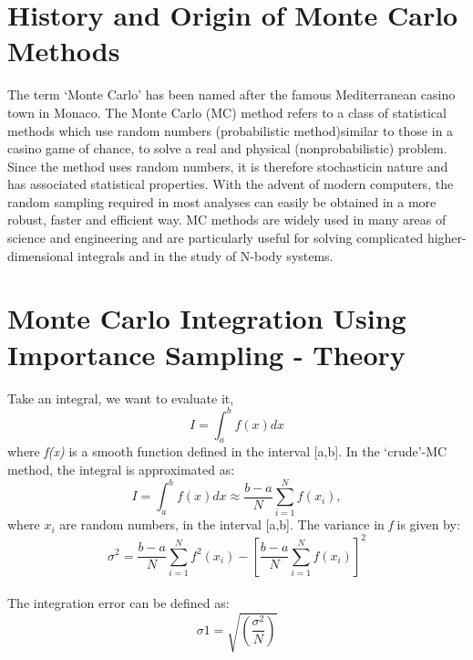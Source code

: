 \documentclass{article}
\begin{document}
\section{History and Origin of Monte Carlo \\ Methods}
The term ‘Monte Carlo’ has been named after the famous Mediterranean casino town in Monaco. The Monte Carlo (MC) method refers to a class of statistical methods which use random numbers (probabilistic method)similar to those in a casino game of chance, to solve a real and physical (nonprobabilistic) problem.  Since the method uses random numbers, it is therefore stochasticin nature and has associated statistical properties. With the advent of modern computers, the random sampling required in most analyses can easily be obtained in a more robust, faster and efficient way. MC methods are widely used in many areas of science and engineering and are particularly useful for solving complicated higher-dimensional integrals and in the study of N-body systems.

\section{Monte Carlo Integration Using Importance Sampling - Theory}
Take an integral, we want to evaluate it, 
\newline
    \begin{equation}\label{eq:fourierrow}
        I=\int_{a}^{b}f(x)dx
    \end{equation}
\newline
where \textit{f(x)} is a smooth function defined in the interval [a,b]. In the ‘crude’-MC method, the integral is approximated as:
\newline
    \begin{equation}\label{eq:fourierrow}
        I=\int_{a}^{b}f(x)dx \approx \frac{b-a}{N}\sum_{i=1}^{N}f(x_{i}),
    \end{equation}
\newline
where ${x_{i}}$ are random numbers, in the interval [a,b]. The variance in \textit{f} is given by:
\newline
    \begin{equation}\label{eq:fourierrow}
        \sigma ^2 = \frac{b-a}{N}\sum_{i=1}^{N}f^2(x_{i})-[\frac{b-a}{N}\sum_{i=1}^{N}f(x_{i})]^2
    \end{equation}\\
    
The integration error can be defined as:
\newline
    \begin{equation}\label{eq:fourierrow}
        \sigma1= \sqrt{(\frac{\sigma^2}{N})}
    \end{equation}\\
    
\end{document}
